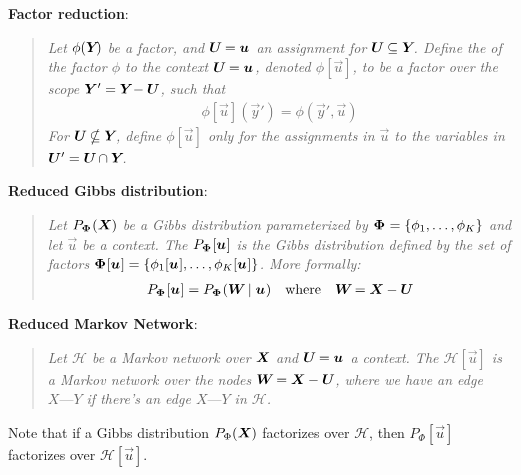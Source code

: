 \documentclass[11pt]{article}
\begin{document}
\p \textbf{Factor reduction}:
\vspace{-0.5em}
\begin{quote}
	{\itshape Let $\phi(\bm{Y}_{})$ be a factor, and $\bm{U}_{} = \bm{u}_{}$ an assignment for $\bm{U}_{} \subseteq \bm{Y}_{}$. Define the  of the factor $\phi$ to the context $\bm{U}_{} = \bm{u}_{}$, denoted $\phi[\vec u]$, to be a factor over the scope $\bm{Y}_{}' = \bm{Y}_{} - \bm{U}_{}$, such that
		\begin{align}
			\phi[\vec u](\vec{y}') = \phi(\vec{y}', \vec u)
		\end{align}
	For $\bm{U}_{} \nsubseteq \bm{Y}_{}$, define $\phi[\vec u]$ only for the assignments in $\vec u$ to the variables in $\bm{U}_{}' = \bm{U}_{} \cap \bm{Y}_{}$. 
	}
\end{quote}

\p \textbf{Reduced Gibbs distribution}:
\vspace{-0.5em}
\begin{quote}
	{\itshape Let $P_{\bm{\Phi}_{}}(\bm{X}_{})$ be a Gibbs distribution parameterized by $\bm{\Phi}_{} = \{\phi_1, \ldots, \phi_K\}$ and let $\vec u$ be a context. The  $P_{\bm{\Phi}_{}}[\bm{u}_{}]$ is the Gibbs distribution defined by the set of factors $\bm{\Phi}_{}[\bm{u}_{}] = \{\phi_1[\bm{u}_{}], \ldots, \phi_K[\bm{u}_{}] \}$. More formally:
		\begin{align}
			P_{\bm{\Phi}_{}}[\bm{u}_{}] = P_{\bm{\Phi}_{}}(\bm{W}_{} \mid \bm{u}_{}) \quad \text{where} \quad \bm{W}_{} = \bm{X}_{} - \bm{U}_{}
		\end{align}
	}
\end{quote}

\p \textbf{Reduced Markov Network}:
\vspace{-1em}
\begin{quote}
	{\itshape Let $\mathcal H$ be a Markov network over $\bm{X}_{}$ and $\bm{U}_{} = \bm{u}_{}$ a context. The  $\mathcal{H}[\vec{u}]$ is a Markov network over the nodes $\bm{W}_{} = \bm{X}_{} - \bm{U}_{}$, where we have an edge $X \text{---} Y$ if there's an edge $X \text{---} Y$ in $\mathcal H$. 
	}
\end{quote}
Note that if a Gibbs distribution $P_{\Phi}(\bm{X}_{})$ factorizes over $\mathcal H$, then $P_{\Phi}[\vec u]$ factorizes over $\mathcal{H}[\vec u]$. 
\end{document}
